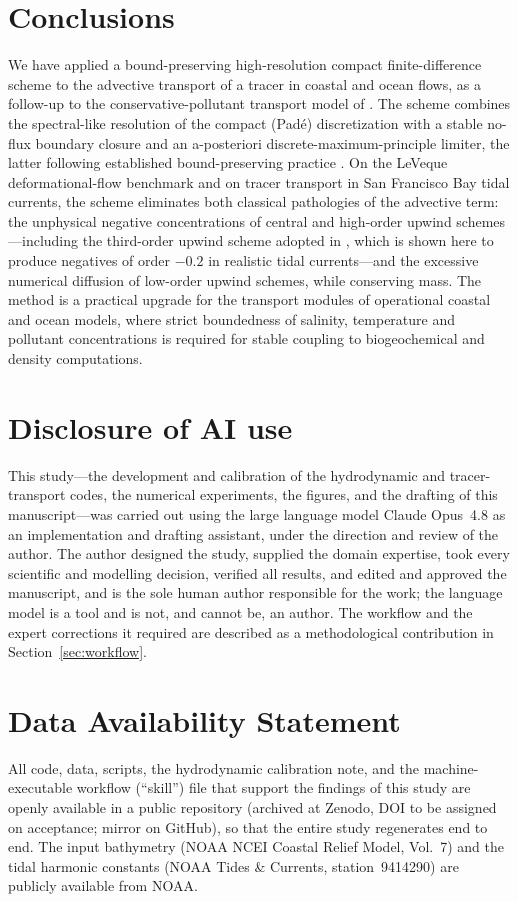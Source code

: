 \documentclass[Journal]{ascelike}   %
\begin{document}
\section{Conclusions}
\label{sec:conclusions}
We have applied a bound-preserving high-resolution compact finite-difference
scheme to the advective transport of a tracer in coastal and ocean flows, as a
follow-up to the conservative-pollutant transport model of
\citet{sankaranarayanan1998}. The scheme combines the spectral-like resolution of
the compact (Pad\'e) discretization with a stable no-flux boundary closure and an
a-posteriori discrete-maximum-principle limiter, the latter following established
bound-preserving practice \citep{zalesak1979,clain2011mood,lixiezhang2018}. On the
LeVeque deformational-flow benchmark and on tracer transport in San Francisco Bay
tidal currents, the scheme eliminates both classical pathologies of the advective
term: the unphysical negative concentrations of central and high-order upwind
schemes---including the third-order upwind scheme adopted in
\citet{sankaranarayanan1998}, which is shown here to produce negatives of order
$-0.2$ in realistic tidal currents---and the excessive numerical diffusion of
low-order upwind schemes, while conserving mass. The method is a practical
upgrade for the transport modules of operational coastal and ocean models, where
strict boundedness of salinity, temperature and pollutant concentrations is
required for stable coupling to biogeochemical and density computations.

\section*{Disclosure of AI use}
This study---the development and calibration of the hydrodynamic and tracer-transport
codes, the numerical experiments, the figures, and the drafting of this
manuscript---was carried out using the large language model Claude Opus~4.8
\citep{anthropic2026claude} as an implementation and drafting assistant, under the
direction and review of the author. The author designed the study, supplied the domain
expertise, took every scientific and modelling decision, verified all results, and
edited and approved the manuscript, and is the sole human author responsible for the
work; the language model is a tool and is not, and cannot be, an author. The workflow
and the expert corrections it required are described as a methodological contribution
in Section~\ref{sec:workflow}.

\section*{Data Availability Statement}
All code, data, scripts, the hydrodynamic calibration note, and the machine-executable
workflow (``skill'') file that support the findings of this study are openly available
in a public repository (archived at Zenodo, DOI to be assigned on acceptance; mirror
on GitHub), so that the entire study regenerates end to end. The input bathymetry
(NOAA NCEI Coastal Relief Model, Vol.~7) and the tidal harmonic constants (NOAA Tides
\& Currents, station~9414290) are publicly available from NOAA.
\end{document}

